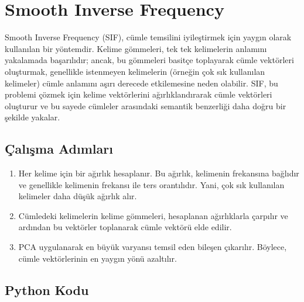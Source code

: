 \section{Smooth Inverse Frequency}

Smooth Inverse Frequency (SIF), cümle temsilini iyileştirmek için yaygın olarak kullanılan bir yöntemdir. Kelime gömmeleri, tek tek kelimelerin anlamını yakalamada başarılıdır; ancak, bu gömmeleri basitçe toplayarak cümle vektörleri oluşturmak, genellikle istenmeyen kelimelerin (örneğin çok sık kullanılan kelimeler) cümle anlamını aşırı derecede etkilemesine neden olabilir. SIF, bu problemi çözmek için kelime vektörlerini ağırlıklandırarak cümle vektörleri oluşturur ve bu sayede cümleler arasındaki semantik benzerliği daha doğru bir şekilde yakalar.

\subsection{Çalışma Adımları}

\begin{enumerate}
    \item Her kelime için bir ağırlık hesaplanır. Bu ağırlık, kelimenin frekansına bağlıdır ve genellikle kelimenin frekansı ile ters orantılıdır. Yani, çok sık kullanılan kelimeler daha düşük ağırlık alır.
    \item Cümledeki kelimelerin kelime gömmeleri, hesaplanan ağırlıklarla çarpılır ve ardından bu vektörler toplanarak cümle vektörü elde edilir.
    \item PCA uygulanarak en büyük varyansı temsil eden bileşen çıkarılır. Böylece, cümle vektörlerinin en yaygın yönü azaltılır.
\end{enumerate}

\subsection{Python Kodu}


